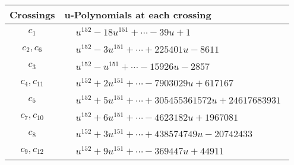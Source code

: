 \documentclass[1p]{elsarticle_modified}
\theoremstyle{definition}
\begin{document}
\begin{tabular}{m{50pt}|m{274pt}}
Crossings & \hspace{64pt}u-Polynomials at each crossing \\
\hline $$\begin{aligned}c_{1}\end{aligned}$$&$\begin{aligned}
&u^{152}-18 u^{151}+\cdots-39 u+1
\end{aligned}$\\
\hline $$\begin{aligned}c_{2},c_{6}\end{aligned}$$&$\begin{aligned}
&u^{152}-3 u^{151}+\cdots+225401 u-8611
\end{aligned}$\\
\hline $$\begin{aligned}c_{3}\end{aligned}$$&$\begin{aligned}
&u^{152}- u^{151}+\cdots-15926 u-2857
\end{aligned}$\\
\hline $$\begin{aligned}c_{4},c_{11}\end{aligned}$$&$\begin{aligned}
&u^{152}+2 u^{151}+\cdots-7903029 u+617167
\end{aligned}$\\
\hline $$\begin{aligned}c_{5}\end{aligned}$$&$\begin{aligned}
&u^{152}+5 u^{151}+\cdots+305455361572 u+24617683931
\end{aligned}$\\
\hline $$\begin{aligned}c_{7},c_{10}\end{aligned}$$&$\begin{aligned}
&u^{152}+6 u^{151}+\cdots-4623182 u+1967081
\end{aligned}$\\
\hline $$\begin{aligned}c_{8}\end{aligned}$$&$\begin{aligned}
&u^{152}+3 u^{151}+\cdots+438574749 u-20742433
\end{aligned}$\\
\hline $$\begin{aligned}c_{9},c_{12}\end{aligned}$$&$\begin{aligned}
&u^{152}+9 u^{151}+\cdots-369447 u+44911
\end{aligned}$\\
\hline
\end{tabular}\\~\\
\end{document}

